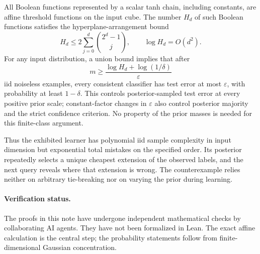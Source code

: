 \documentclass[11pt]{article}
\theoremstyle{remark}\newtheorem{remark}[theorem]{Remark}
\begin{document}
All Boolean functions represented by a scalar tanh chain, including constants, are affine
threshold functions on the input cube. The number $H_d$ of such Boolean
functions satisfies the hyperplane-arrangement bound
\[
 H_d\le2\sum_{j=0}^{d}\binom{2^d-1}{j},\qquad \log H_d=O(d^2).
\]
For any input distribution, a union bound implies that after
\[
 m\ge\frac{\log H_d+\log(1/\delta)}{\varepsilon}
\]
iid noiseless examples, every consistent classifier has test error at most
$\varepsilon$, with probability at least $1-\delta$.
This controls posterior-sampled test error at every positive prior scale;
constant-factor changes in $\varepsilon$ also control posterior majority
and the strict confidence criterion. No property of the prior masses is
needed for this finite-class argument.

Thus the exhibited learner has polynomial iid sample complexity in input
dimension but exponential total mistakes on the specified order. Its
posterior repeatedly selects a unique cheapest extension of the observed
labels, and the next query reveals where that extension is wrong. The
counterexample relies neither on arbitrary tie-breaking nor on varying
the prior during learning.

\appendix


\paragraph{Verification status.}
The proofs in this note have undergone independent mathematical checks
by collaborating AI agents. They have not been formalized in Lean.
The exact affine calculation is the central step; the probability
statements follow from finite-dimensional Gaussian concentration.
\end{document}
